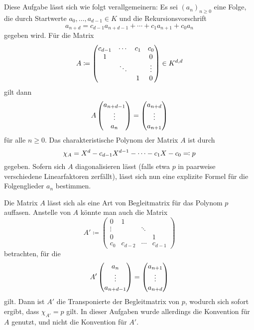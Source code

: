 \section{}

Diese Aufgabe lässt sich wie folgt verallgemeinern:
Es sei $(a_n)_{n \geq 0}$ eine Folge, die durch Startwerte $a_0, \dotsc, a_{d-1} \in K$ und die Rekursionsvorschrift
\[
    a_{n+d}
  = c_{d-1} a_{n+d-1} + \dotsb + c_1 a_{n+1} + c_0 a_{n}
\]
gegeben wird.
Für die Matrix
\[
            A
  \coloneqq \begin{pmatrix}
              c_{d-1} & \cdots  & c_1 & c_0     \\
              1       &         &     & 0       \\
                      & \ddots  &     & \vdots  \\
                      &         & 1   & 0
            \end{pmatrix}
  \in       \matrices{d}{K}
\]
gilt dann
\[
    A \columnvector{a_{n+d-1} \\ \vdots \\ a_n}
  =   \columnvector{a_{n+d} \\ \vdots \\ a_{n+1}}
\]
für alle $n \geq 0$.
Das charakteristische Polynom der Matrix $A$ ist durch
\[
              \charpoly{A}
  =           X^d - c_{d-1} X^{d-1} - \dotsb - c_1 X - c_0
  \definedas  p
\]
gegeben.
Sofern sich $A$ diagonalisieren lässt (falls etwa $p$ in paarweise verschiedene Linearfaktoren zerfällt), lässt sich nun eine explizite Formel für die Folgenglieder $a_n$ bestimmen.

\begin{remark}
  Die Matrix $A$ lässt sich als eine Art von Begleitmatrix für das Polynom $p$ auffasen.
  Anstelle von $A$ könnte man auch die Matrix
  \[
              A'
    \coloneqq \begin{pmatrix}
                0       & 1       &         &         \\
                \vdots  &         & \ddots  &         \\
                0       &         &         & 1       \\
                c_0     & c_{d-2} & \cdots  & c_{d-1}
              \end{pmatrix}
  \]
  betrachten, für die
  \[
      A' \columnvector{a_n \\ \vdots \\ a_{n+d-1}}
    =    \columnvector{a_{n+1} \\ \vdots \\ a_{n+d}}
  \]
  gilt.
  Dann ist $A'$ die Transponierte der Begleitmatrix von $p$, wodurch sich sofort ergibt, dass $\chi_{A'} = p$ gilt.
  In dieser Aufgaben wurde allerdings die Konvention für $A$ genutzt, und nicht die Konvention für $A'$.
\end{remark}


